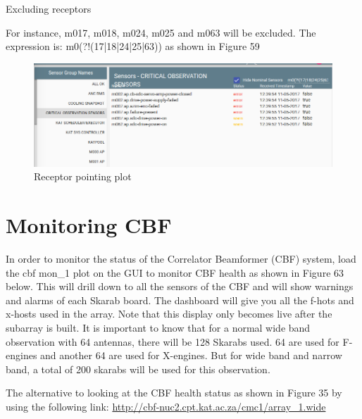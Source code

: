 Excluding receptors

For instance, m017, m018, m024, m025 and m063 will be excluded. The expression is: m0(?!(17|18|24|25|63)) as shown in Figure 59



\begin{figure}[!thb]
	\centering
	\includegraphics[scale=0.23]{Chapters/images/image88.png}
	
	\caption{Receptor pointing plot}
	\label{fig:image88}
\end{figure}


\section{ Monitoring CBF}
In order to monitor the status of the Correlator Beamformer (CBF) system, load the cbf mon\_1 plot on the GUI to monitor CBF health as shown in Figure 63 below. This will drill down to all the sensors of the CBF and will show warnings and alarms of each Skarab board. The dashboard will give you all the f-hots and x-hosts used in the array. Note that this display only becomes live after the subarray is built. 
It is important to know that for a normal wide band observation with 64 antennas, there will be 128 Skarabs used. 64 are used for F-engines and another 64 are used for X-engines.  But for wide band and narrow band, a total of 200 skarabs will be used for this observation. 

The alternative to looking at the CBF health status as shown in Figure 35 by using the following link:
\url{http://cbf-nuc2.cpt.kat.ac.za/cmc1/array\_1.wide}



